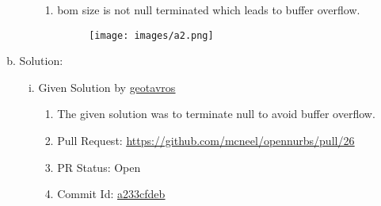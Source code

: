 \documentclass[14pt,a4paper]{report}
\begin{document}
\begin{enumerate}[I.]
\begin{enumerate}[a.]
\begin{enumerate}[i.]
                \begin{enumerate}[1.]
                    \item bom size is not null terminated which leads to buffer overflow.
                    \begin{figure}[h!]
                        \centering
                        \texttt{[image: images/a2.png]}
                    \end{figure}
                \end{enumerate}
            \end{enumerate}
        \item Solution:
            \begin{enumerate}[i.]
                \item Given Solution by \underline{\href{https://github.com/geotavros}{geotavros}}
                \begin{enumerate}[1.]
                    \item The given solution was to terminate null to avoid buffer overflow.
                    \item Pull Request: \underline{\href{https://github.com/mcneel/opennurbs/pull/26}{https://github.com/mcneel/opennurbs/pull/26}}
                    \item PR Status: Open
                    \item Commit Id: \underline{\href{https://github.com/geotavros/opennurbs/commit/a233cfdeb04d13c3021abadedbcb3e79cae363d8}{a233cfdeb}}
                \end{enumerate}
            \end{enumerate}
    \end{enumerate}
\end{enumerate}
 
\end{document}
